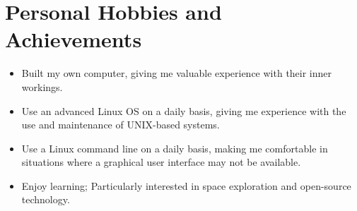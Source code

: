 \documentclass[letterpaper,10pt]{article}
\begin{document}
\section*{Personal Hobbies and Achievements}
	\begin{itemize}
	\item Built my own computer, giving me valuable experience with their inner workings.
	\item Use an advanced Linux OS on a daily basis, giving me experience with the use and maintenance of UNIX-based systems.
	\item Use a Linux command line on a daily basis, making me comfortable in situations where a graphical user interface may not be available.
	\item Enjoy learning; Particularly interested in space exploration and open-source technology.
	\end{itemize}
{\let\thefootnote\relax{}} 
\end{document}
